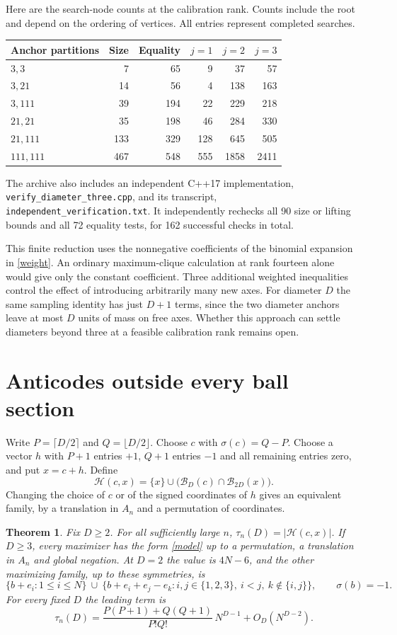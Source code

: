 \documentclass[10pt]{article}
\newtheorem{theorem}{Theorem}
\newcommand{\Hh}{\mathcal H}
\newcommand{\s}{\sigma}
\newcommand{\B}{\mathcal B}
\begin{document}
Here are the search-node counts at the calibration rank. Counts include the root and depend on the ordering of vertices. All entries represent completed searches.
\begin{center}
\begin{tabular}{lrrrrr}\toprule
Anchor partitions & Size & Equality & $j=1$ & $j=2$ & $j=3$\\\midrule
$3,3$     &7&65&9&37&57\\
$3,21$    &14&56&4&138&163\\
$3,111$   &39&194&22&229&218\\
$21,21$   &35&198&46&284&330\\
$21,111$  &133&329&128&645&505\\
$111,111$ &467&548&555&1858&2411\\\bottomrule
\end{tabular}
\end{center}
The archive also includes an independent C++17 implementation, \texttt{verify\_diameter\_three.cpp}, and its transcript, \texttt{independent\_verification.txt}. It independently rechecks all 90 size or lifting bounds and all 72 equality tests, for 162 successful checks in total.

This finite reduction uses the nonnegative coefficients of the binomial expansion in \eqref{weight}. An ordinary maximum-clique calculation at rank fourteen alone would give only the constant coefficient. Three additional weighted inequalities control the effect of introducing arbitrarily many new axes. For diameter $D$ the same sampling identity has just $D+1$ terms, since the two diameter anchors leave at most $D$ units of mass on free axes. Whether this approach can settle diameters beyond three at a feasible calibration rank remains open.

\section{Anticodes outside every ball section}

Write $P=\lceil D/2\rceil$ and $Q=\lfloor D/2\rfloor$. Choose $c$ with $\s(c)=Q-P$. Choose a vector $h$ with $P+1$ entries $+1$, $Q+1$ entries $-1$ and all remaining entries zero, and put $x=c+h$. Define
\[
 \Hh(c,x)=\{x\}\cup\bigl(\B_D(c)\cap\B_{2D}(x)\bigr).
 \tag{1}\label{model}
\]
Changing the choice of $c$ or of the signed coordinates of $h$ gives an equivalent family, by a translation in $A_n$ and a permutation of coordinates.

\begin{theorem}\label{main}
Fix $D\ge2$. For all sufficiently large $n$, $\tau_n(D)=|\Hh(c,x)|$. If $D\ge3$, every maximizer has the form \eqref{model} up to a permutation, a translation in $A_n$ and global negation. At $D=2$ the value is $4N-6$, and the other maximizing family, up to these symmetries, is
\[
  \{b+e_i:1\le i\le N\}\ \cup\
  \{b+e_i+e_j-e_k:i,j\in\{1,2,3\},\ i<j,\ k\notin\{i,j\}\},
  \qquad \s(b)=-1 .
  \tag{2}\label{tet}
\]
For every fixed $D$ the leading term is
\[
 \tau_n(D)=\frac{P(P+1)+Q(Q+1)}{P!Q!}\,N^{D-1}+O_D(N^{D-2}).
 \tag{3}\label{asympt}
\]
\end{theorem}
\end{document}
